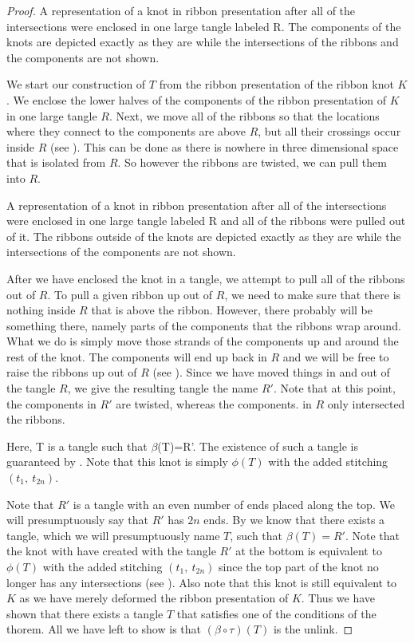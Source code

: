 \begin{paper}
\begin{proof}
{A representation of a knot in ribbon presentation after all of the
intersections were enclosed in one large tangle labeled R.
The components of the knots are depicted exactly as they are while the
intersections of the ribbons and the components are not shown.}

We start our construction of $T$ from the ribbon presentation of the ribbon knot
$K$.
We enclose the lower halves of the components of the ribbon presentation of $K$
in one large tangle $R$.
Next, we move all of the ribbons so that the locations where they connect to the
components are above $R$, but all their crossings occur inside $R$
(see \figLowered).
This can be done as there is nowhere in three dimensional space that is isolated
from $R$.
So however the ribbons are twisted, we can pull them into $R$.

{A representation of a knot in ribbon presentation after all of the
intersections were enclosed in one large tangle labeled R and all of the ribbons
were pulled out of it.
The ribbons outside of the knots are depicted exactly as they are while the
intersections of the components are not shown.}

After we have enclosed the knot in a tangle, we attempt to pull all of the
ribbons out of $R$.
To pull a given ribbon up out of $R$, we need to make sure that there is nothing
inside $R$ that is above the ribbon.
However, there probably will be something there, namely parts of the components
that the ribbons wrap around.
What we do is simply move those strands of the components up and around the rest
of the knot.
The components will end up back in $R$ and we will be free to raise the ribbons
up out of $R$ (see \figTwisted).
Since we have moved things in and out of the tangle $R$, we give the resulting
tangle the name $R'$.
Note that at this point, the components in $R'$ are twisted, whereas the
components. in $R$ only intersected the ribbons.

{Here, T is a tangle such that $\beta$(T)=R'.
The existence of such a tangle is guaranteed by \lemTangles.
Note that this knot is simply $\phi(T)$ with the added stitching
$(t_1,~t_{2n})$.}

Note that $R'$ is a tangle with an even number of ends placed along the top.
We will presumptuously say that $R'$ has $2n$ ends.
By \lemTangles we know that there exists a tangle, which we will presumptuously
name $T$, such that $\beta(T)=R'$.
Note that the knot with have created with the tangle $R'$ at the bottom is
equivalent to $\phi(T)$ with the added stitching $(t_1,~t_{2n})$ since the top
part of the knot no longer has any intersections (see \figFinal).
Also note that this knot is still equivalent to $K$ as we have merely deformed
the ribbon presentation of $K$.
Thus we have shown that there exists a tangle $T$ that satisfies one of the
conditions of the thorem.
All we have left to show is that $(\beta\circ\tau)(T)$ is the unlink.


\end{proof}
\end{paper}
